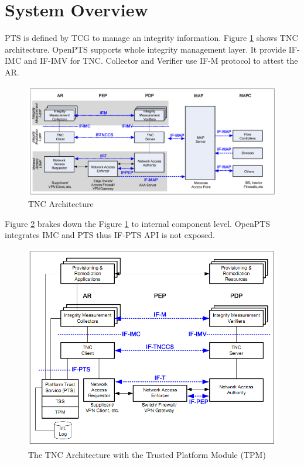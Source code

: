 \documentclass[12pt,a4paper]{article}
\begin{document}
\section{System Overview}

PTS is defined by TCG to manage an integrity information.
Figure \ref{fig:tncarch} shows TNC architecture.
OpenPTS supports whole integrity management layer.
It provide IF-IMC and IF-IMV for TNC.
Collector and Verifier use IF-M protocol to attest the AR.

\begin{figure}[b!p]
  \begin{center}
    \includegraphics[width=15cm]{TNC_Architecture_1.png}
  \end{center}
  \caption{TNC Architecture\cite{tncarch}}
  \label{fig:tncarch}
\end{figure}


Figure \ref{fig:tncwpts} brakes down the Figure \ref{fig:tncarch} to internal component level.
OpenPTS integrates IMC and PTS thus IF-PTS API is not exposed.

\begin{figure}[b!p]
  \begin{center}
    \includegraphics[width=12cm]{TNC_Architecture_2.png}
  \end{center}
  \caption{The TNC Architecture with the Trusted Platform Module (TPM)\cite{tncarch}}
  \label{fig:tncwpts}
\end{figure}
\end{document}
